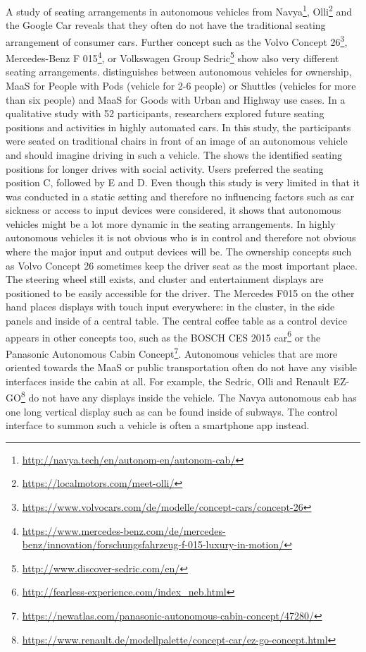 A study of seating arrangements in autonomous vehicles from Navya\footnote{\url{http://navya.tech/en/autonom-en/autonom-cab/}}, Olli\footnote{\url{https://localmotors.com/meet-olli/}} and the Google Car reveals that they often do not have the traditional seating arrangement of consumer cars. Further concept such as the Volvo Concept 26\footnote{\url{https://www.volvocars.com/de/modelle/concept-cars/concept-26}}, Mercedes-Benz F 015\footnote{\url{https://www.mercedes-benz.com/de/mercedes-benz/innovation/forschungsfahrzeug-f-015-luxury-in-motion/}}, or Volkswagen Group Sedric\footnote{\url{http://www.discover-sedric.com/en/}} show also very different seating arrangements. \cite{Jungwirth2017LeadershipGroup} distinguishes between autonomous vehicles for ownership, MaaS for People with Pods (vehicle for 2-6 people) or Shuttles (vehicles for more than six people) and MaaS for Goods with Urban and Highway use cases. In a qualitative study \cite{Jorlov2017} with 52 participants, researchers explored future seating positions and activities in highly automated cars. In this study, the participants were seated on traditional chairs in front of an image of an autonomous vehicle and should imagine driving in such a vehicle. The  shows the identified seating positions for longer drives with social activity. Users preferred the seating position C, followed by E and D. Even though this study is very limited in that it was conducted in a static setting and therefore no influencing factors such as car sickness or access to input devices were considered, it shows that autonomous vehicles might be a lot more dynamic in the seating arrangements.  In highly autonomous vehicles it is not obvious who is in control and therefore not obvious where the major input and output devices will be. The ownership concepts such as Volvo Concept 26 sometimes keep the driver seat as the most important place. The steering wheel still exists, and cluster and entertainment displays are positioned to be easily accessible for the driver. The Mercedes F015 on the other hand places displays with touch input everywhere: in the cluster, in the side panels and inside of a central table. The central coffee table as a control device appears in other concepts too, such as the BOSCH CES 2015 car\footnote{\url{http://fearless-experience.com/index_neb.html}} or the Panasonic Autonomous Cabin Concept\footnote{\url{https://newatlas.com/panasonic-autonomous-cabin-concept/47280/}}. Autonomous vehicles that are more oriented towards the MaaS or public transportation often do not have any visible interfaces inside the cabin at all. For example, the Sedric, Olli and Renault EZ-GO\footnote{\url{https://www.renault.de/modellpalette/concept-car/ez-go-concept.html}} do not have any displays inside the vehicle. The Navya autonomous cab has one long vertical display such as can be found inside of subways. The control interface to summon such a vehicle is often a smartphone app instead. 

